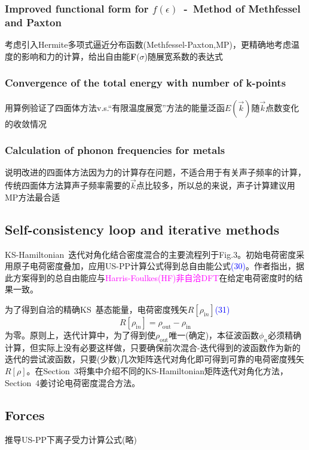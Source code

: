 \documentclass[14pt]{article}      %
\begin{document}
\subsubsection{Improved functional form for $f(\epsilon)$~-~Method of Methfessel and Paxton}
考虑引入\textrm{Hermite}多项式逼近分布函数(\textrm{Methfessel-Paxton},MP)，更精确地考虑温度的影响和力的计算，给出自由能\textbf{F}($\sigma$)随展宽系数的表达式
\subsubsection{Convergence of the total energy with number of k-points}
用算例验证了四面体方法\textrm{v.s.}“有限温度展宽”方法的能量泛函$E(\vec k)$随$\vec k$点数变化的收敛情况
\subsubsection{Calculation of phonon frequencies for metals}
说明改进的四面体方法因为力的计算存在问题，不适合用于有关声子频率的计算，传统四面体方法算声子频率需要的$\vec k$点比较多，所以总的来说，声子计算建议用\textrm{MP}方法最合适
\subsection{Self-consistency loop and iterative methods}
\textrm{KS-Hamiltonian~}迭代对角化结合密度混合的主要流程列于\textrm{Fig.3}。初始电荷密度采用原子电荷密度叠加，应用\textrm{US-PP}计算公式得到总自由能公式\textcolor{blue}{\textrm{(30)}}。作者指出，据此方案得到的总自由能应与\textcolor{magenta}{\textrm{Harris-Foulkes(HF)}非自洽\textrm{DFT}}在给定电荷密度时的结果一致。

为了得到自洽的精确\textrm{KS~}基态能量，电荷密度残矢$R[\rho_{\mathrm in}]$\textcolor{blue}{\textrm{(31)}}
\begin{displaymath}
	R[\rho_{\mathrm in}]=\rho_{\mathrm{out}}-\rho_{\mathrm{in}}
\end{displaymath}
为零。原则上，迭代计算中，为了得到使$\rho_{\mathrm{out}}$唯一(确定)，本征波函数$\phi_n$必须精确计算，但实际上没有必要这样做，只要确保前次混合-迭代得到的波函数作为新的迭代的尝试波函数，只要(少数)几次矩阵迭代对角化即可得到可靠的电荷密度残矢$R[\rho]$。在\textrm{Section~3}将集中介绍不同的\textrm{KS-Hamiltonian}矩阵迭代对角化方法，\textrm{Section~4}姜讨论电荷密度混合方法。
\subsection{Forces}
推导\textrm{US-PP}下离子受力计算公式(略)
\end{document}
